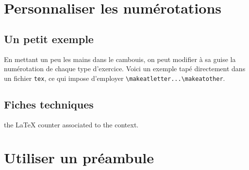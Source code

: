 \documentclass[12pt,a4paper]{scrartcl}
\begin{document}
\bigskip



\exosoptions{}



\section{Personnaliser les numérotations}

    \subsection{Un petit exemple}

En mettant un peu les mains dans le cambouis, on peut modifier à sa guise la numérotation de chaque type d'exercice. Voici un exemple tapé directement dans un fichier \verb+tex+, ce qui impose d'employer \verb+\makeatletter...\makeatother+.

\resetallcnt{}

\begin{tcblisting}{}
\makeatletter
    \renewcommand\lyxam@counter@exercise@style[1]{-- \arabic{#1} --}
\makeatother

\exercise
\exercise
\end{tcblisting}


    \subsection{Fiches techniques}









\IDarg{} the \LaTeX{} counter associated to the context.


\section{Utiliser un préambule}
\end{document}

